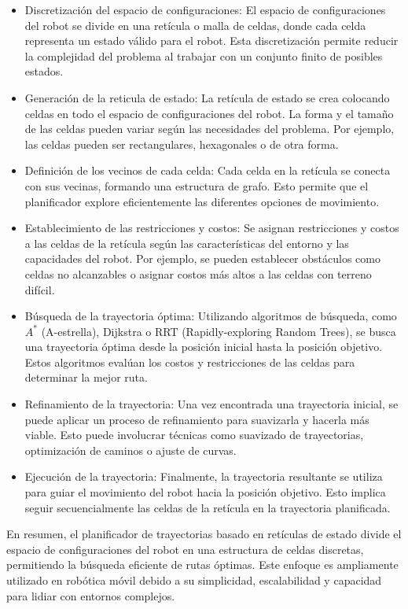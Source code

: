 \documentclass{article}
\begin{document}
\begin{itemize}
  \begin{itemize}
  \item Discretización del espacio de configuraciones: El espacio de configuraciones del robot se divide en una retícula o malla de celdas, donde cada celda representa un estado válido para el robot. Esta discretización permite reducir la complejidad del problema al trabajar con un conjunto finito de posibles estados.
  \item Generación de la reticula de estado: La retícula de estado se crea colocando celdas en todo el espacio de configuraciones del robot. La forma y el tamaño de las celdas pueden variar según las necesidades del problema. Por ejemplo, las celdas pueden ser rectangulares, hexagonales o de otra forma.
  \item Definición de los vecinos de cada celda: Cada celda en la retícula se conecta con sus vecinas, formando una estructura de grafo. Esto permite que el planificador explore eficientemente las diferentes opciones de movimiento.
  \item Establecimiento de las restricciones y costos: Se asignan restricciones y costos a las celdas de la retícula según las características del entorno y las capacidades del robot. Por ejemplo, se pueden establecer obstáculos como celdas no alcanzables o asignar costos más altos a las celdas con terreno difícil.
  \item Búsqueda de la trayectoria óptima: Utilizando algoritmos de búsqueda, como $A^{*}$ (A-estrella), Dijkstra o RRT (Rapidly-exploring Random Trees), se busca una trayectoria óptima desde la posición inicial hasta la posición objetivo. Estos algoritmos evalúan los costos y restricciones de las celdas para determinar la mejor ruta.
  \item Refinamiento de la trayectoria: Una vez encontrada una trayectoria inicial, se puede aplicar un proceso de refinamiento para suavizarla y hacerla más viable. Esto puede involucrar técnicas como suavizado de trayectorias, optimización de caminos o ajuste de curvas.
  \item Ejecución de la trayectoria: Finalmente, la trayectoria resultante se utiliza para guiar el movimiento del robot hacia la posición objetivo. Esto implica seguir secuencialmente las celdas de la retícula en la trayectoria planificada.
  \end{itemize}

  En resumen, el planificador de trayectorias basado en retículas de estado divide el espacio de configuraciones del robot en una estructura de celdas discretas, permitiendo la búsqueda eficiente de rutas óptimas. Este enfoque es ampliamente utilizado en robótica móvil debido a su simplicidad, escalabilidad y capacidad para lidiar con entornos complejos.
  
\end{itemize}
\end{document}
